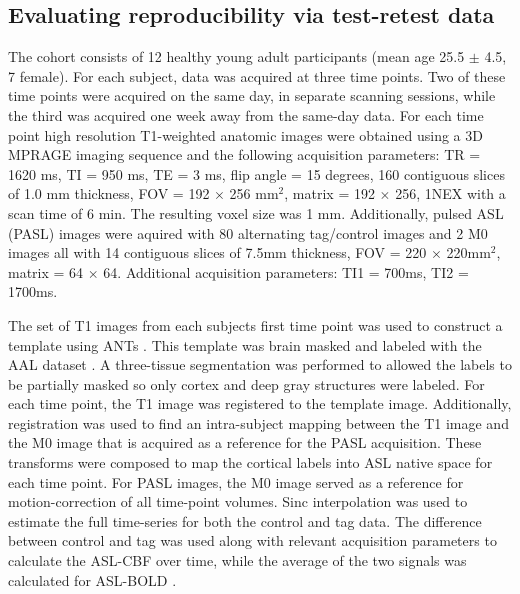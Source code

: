 \documentclass{llncs}
\begin{document}
\subsection{Evaluating reproducibility via test-retest data}
 The cohort consists of 12 healthy young adult participants  (mean age 25.5 $\pm$ 4.5, 7 female). For each subject, data was acquired at three time points. Two of these time points were acquired on the same day, in separate scanning sessions, while the third was acquired one week away from the same-day data.  For each time point high resolution T1-weighted anatomic images were obtained using a 3D MPRAGE imaging sequence and the following acquisition parameters: TR = 1620 ms, TI = 950 ms, TE = 3 ms, flip angle = 15 degrees, 160 contiguous slices of 1.0 mm thickness, FOV = 192 $\times$ 256 mm$^2$, matrix = 192 $\times$ 256, 1NEX with a scan time of 6 min. The resulting voxel size was 1 mm.  Additionally, pulsed ASL (PASL) images were aquired with 80 alternating tag/control images and 2 M0 images all with 14 contiguous slices of 7.5mm thickness, FOV = 220 $\times$ 220mm$^2$, matrix = 64 $\times$ 64. Additional acquisition parameters: TI1 = 700ms, TI2 = 1700ms.

 The set of T1 images from each subjects first time point was used to construct a template using ANTs \cite{Avants2011}. This template was brain masked and labeled with the AAL dataset \cite{Tzourio-Mazoyer2002}. A three-tissue segmentation was performed to allowed the labels to be partially masked so only cortex and deep gray structures were labeled. For each time point, the T1 image was registered to the template image. Additionally, registration was used to find an intra-subject mapping between the T1 image and the M0 image that is acquired as a reference for the PASL acquisition. These transforms were composed to map the cortical labels into ASL native space for each time point. For PASL images, the M0 image served as a reference for motion-correction of all time-point volumes. Sinc interpolation was used to estimate the full time-series for both the control and tag data. The difference between control and tag was used along with relevant acquisition parameters to calculate the ASL-CBF over time, while the average of the two signals was calculated for ASL-BOLD \cite{Wong1997}. 
\end{document}
